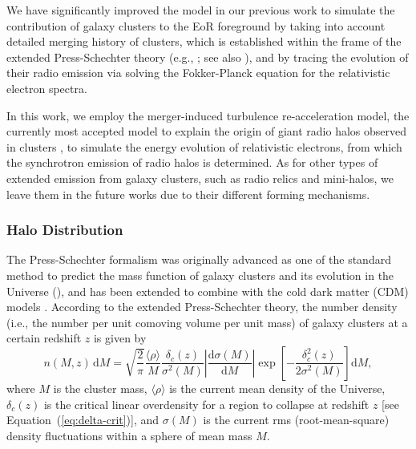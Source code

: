 \documentclass[modern]{aastex61}
\newcommand{\R}[1]{\mathrm{#1}}
\newcommand{\D}[1]{\R{d} #1}
\newcommand{\diff}[2]{\frac{\D{#1}}{\D{#2}}}
\begin{document}
We have significantly improved the model in our previous work \citep{wang2010}
to simulate the contribution of galaxy clusters to the EoR foreground by
taking into account detailed merging history of clusters, which is
established within the frame of the extended Press-Schechter theory
(e.g., \citealt{bond1991,lacey1993}; see also \citealt{press1974}),
and by tracing the evolution of their radio emission via solving the
Fokker-Planck equation for the relativistic electron spectra.

In this work, we employ the merger-induced turbulence re-acceleration
model, the currently most accepted model to explain the origin of giant
radio halos observed in clusters
\citep[see][for recent reviews]{feretti2012rev,brunetti2014rev},
to simulate the energy evolution of relativistic electrons, from which
the synchrotron emission of radio halos is determined.
As for other types of extended emission from galaxy clusters, such as
radio relics and mini-halos, we leave them in the future works due to
their different forming mechanisms.


\subsubsection{Halo Distribution}
\label{sec:distributions}

The Press-Schechter formalism was originally advanced as one of the standard
method to predict the mass function of galaxy clusters and its evolution
in the Universe (\citet{press1974}), and has been extended to combine with
the cold dark matter (CDM) models \citep[e.g.,][]{bond1991,lacey1993}.
According to the extended Press-Schechter theory, the number density (i.e.,
the number per unit comoving volume per unit mass) of galaxy clusters
at a certain redshift $z$ is given by
\begin{equation}
  n(M, z) \,\D{M} = \sqrt{\frac{2}{\pi}} \frac{\langle{\rho}\rangle}{M}
  \frac{\delta_c(z)}{\sigma^2(M)} \left| \diff{\sigma(M)}{M} \right|
  \exp\!\left[ -\frac{\delta_c^2(z)}{2\sigma^2(M)} \right] \D{M},
\end{equation}
where
$M$ is the cluster mass,
$\langle {\rho} \rangle$ is the current mean density of the Universe,
$\delta_c(z)$ is the critical linear overdensity for a region to collapse
at redshift $z$ [see Equation~(\ref{eq:delta-crit})],
and $\sigma(M)$ is the current rms (root-mean-square) density fluctuations
within a sphere of mean mass $M$.
\end{document}
